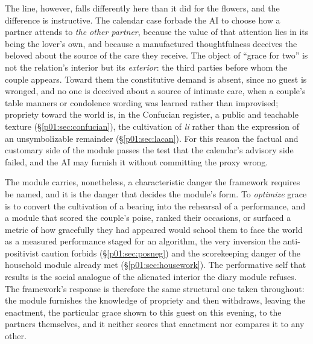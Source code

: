 \documentclass[11pt,a4paper]{article}
\begin{document}
The line, however, falls differently here than it did for the flowers, and the difference is instructive. The calendar case forbade the AI to choose how a partner attends to \emph{the other partner}, because the value of that attention lies in its being the lover's own, and because a manufactured thoughtfulness deceives the beloved about the source of the care they receive. The object of ``grace for two'' is not the relation's interior but its \emph{exterior}: the third parties before whom the couple appears. Toward them the constitutive demand is absent, since no guest is wronged, and no one is deceived about a source of intimate care, when a couple's table manners or condolence wording was learned rather than improvised; propriety toward the world is, in the Confucian register, a public and teachable texture (§\ref{p01:sec:confucian}), the cultivation of \emph{li} rather than the expression of an unsymbolizable remainder (§\ref{p01:sec:lacan}). For this reason the factual and customary side of the module passes the test that the calendar's advisory side failed, and the AI may furnish it without committing the proxy wrong.

The module carries, nonetheless, a characteristic danger the framework requires be named, and it is the danger that decides the module's form. To \emph{optimize} grace is to convert the cultivation of a bearing into the rehearsal of a performance, and a module that scored the couple's poise, ranked their occasions, or surfaced a metric of how gracefully they had appeared would school them to face the world as a measured performance staged for an algorithm, the very inversion the anti-positivist caution forbids (§\ref{p01:sec:posneg}) and the scorekeeping danger of the household module already met (§\ref{p01:sec:housework}). The performative self that results is the social analogue of the alienated interior the diary module refuses. The framework's response is therefore the same structural one taken throughout: the module furnishes the knowledge of propriety and then withdraws, leaving the enactment, the particular grace shown to this guest on this evening, to the partners themselves, and it neither scores that enactment nor compares it to any other.
\end{document}
